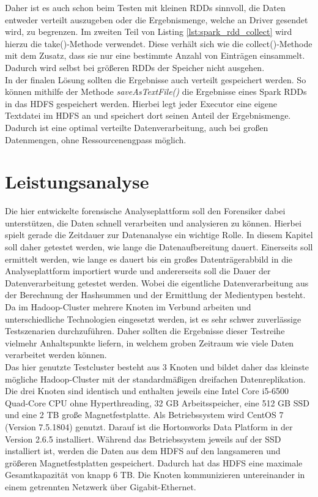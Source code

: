 \noindent
Daher ist es auch schon beim Testen mit kleinen RDDs sinnvoll, die Daten entweder verteilt auszugeben oder die Ergebnismenge, welche an Driver gesendet wird, zu begrenzen. Im zweiten Teil von Listing \ref{lst:spark_rdd_collect}  wird hierzu die take()-Methode verwendet. Diese verhält sich wie  die collect()-Methode mit dem Zusatz, dass sie nur eine bestimmte Anzahl von Einträgen einsammelt. Dadurch wird selbst bei größeren RDDs der Speicher nicht ausgehen.\\
In der finalen Lösung sollten die Ergebnisse auch verteilt gespeichert werden.  So können mithilfe der Methode \textit{saveAsTextFile()} die Ergebnisse eines Spark RDDs in das HDFS gespeichert werden. Hierbei legt jeder Executor eine eigene Textdatei im HDFS an und speichert dort seinen Anteil der Ergebnismenge. Dadurch ist eine optimal verteilte Datenverarbeitung, auch bei großen Datenmengen, ohne Ressourcenengpass möglich. 


\section{Leistungsanalyse}
\label{sec:performance_analysis}
Die hier entwickelte forensische Analyseplattform soll den Forensiker dabei unterstützen, die Daten schnell verarbeiten und analysieren zu können. Hierbei spielt gerade die Zeitdauer zur Datenanalyse ein wichtige Rolle. In diesem Kapitel soll daher getestet werden, wie lange die Datenaufbereitung dauert. Einerseits soll ermittelt werden, wie lange es dauert bis ein großes Datenträgerabbild in die Analyseplattform importiert wurde und andererseits soll die Dauer der Datenverarbeitung getestet werden. Wobei die eigentliche Datenverarbeitung aus der Berechnung der Hashsummen und der Ermittlung der Medientypen besteht.\\

\noindent
Da im Hadoop-Cluster mehrere Knoten im Verbund arbeiten und unterschiedliche Technologien eingesetzt werden, ist es sehr schwer zuverlässige Testszenarien durchzuführen. Daher sollten die Ergebnisse dieser Testreihe vielmehr Anhaltspunkte liefern, in welchem groben Zeitraum wie viele Daten verarbeitet werden können.\\

\noindent
Das hier genutzte Testcluster besteht aus 3 Knoten und bildet daher das kleinste mögliche Hadoop-Cluster mit der standardmäßigen dreifachen Datenreplikation. Die drei Knoten sind identisch und enthalten jeweils eine Intel Core i5-6500 Quad-Core CPU ohne Hyperthreading, 32 GB Arbeitsspeicher, eine 512 GB SSD und eine 2 TB große Magnetfestplatte. Als Betriebssystem wird CentOS 7 (Version 7.5.1804) genutzt. Darauf ist die Hortonworks Data Platform in der Version 2.6.5 installiert. Während das Betriebssystem jeweils auf der SSD installiert ist, werden die Daten aus dem HDFS auf den langsameren und größeren Magnetfestplatten gespeichert. Dadurch hat das HDFS eine maximale Gesamtkapazität von knapp 6 TB. Die Knoten kommunizieren untereinander in einem getrennten Netzwerk über Gigabit-Ethernet.\\  

